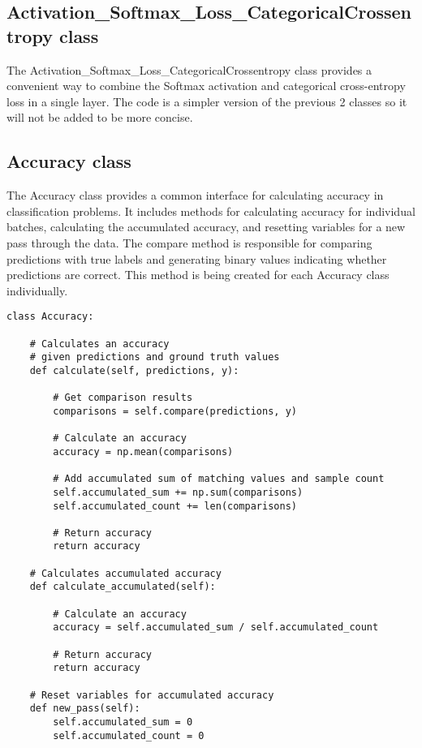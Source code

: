 \documentclass{article}
\begin{document}
\subsection{Activation\_Softmax\_Loss\_CategoricalCrossentropy class}
The Activation\_Softmax\_Loss\_CategoricalCrossentropy class provides a convenient way to combine the Softmax activation and categorical cross-entropy loss in a single layer. The code is a simpler version of the previous 2 classes so it will not be added to be more concise. 

\subsection{Accuracy class}
The Accuracy class provides a common interface for calculating accuracy in classification problems. It includes methods for calculating accuracy for individual batches, calculating the accumulated accuracy, and resetting variables for a new pass through the data. The compare method is responsible for comparing predictions with true labels and generating binary values indicating whether predictions are correct. This method is being created for each Accuracy class individually. 

\begin{lstlisting}
class Accuracy:

    # Calculates an accuracy
    # given predictions and ground truth values
    def calculate(self, predictions, y):

        # Get comparison results
        comparisons = self.compare(predictions, y)

        # Calculate an accuracy
        accuracy = np.mean(comparisons)

        # Add accumulated sum of matching values and sample count
        self.accumulated_sum += np.sum(comparisons)
        self.accumulated_count += len(comparisons)

        # Return accuracy
        return accuracy

    # Calculates accumulated accuracy
    def calculate_accumulated(self):

        # Calculate an accuracy
        accuracy = self.accumulated_sum / self.accumulated_count

        # Return accuracy
        return accuracy

    # Reset variables for accumulated accuracy
    def new_pass(self):
        self.accumulated_sum = 0
        self.accumulated_count = 0

\end{lstlisting}
\end{document}
